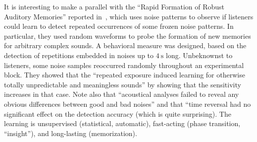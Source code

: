 \documentclass[brainsci, %
               review,accept,pdftex,moreauthors
               ]{Definitions/mdpi}
\begin{document}
It is interesting to make a parallel with the ``Rapid Formation of Robust Auditory Memories'' reported in~\citep{agus_rapid_2010}, which uses noise patterns to observe if listeners could learn to detect repeated occurrences of some frozen noise patterns. In particular, they used random waveforms to probe the formation of new memories for arbitrary complex sounds. A behavioral measure was designed, based on the detection of repetitions embedded in noises up to $4~ \si{\second}$ long. %
Unbeknownst to listeners, some noise samples reoccurred randomly throughout an experimental block. They showed that the ``repeated exposure induced learning for otherwise totally unpredictable and meaningless sounds'' by showing that the sensitivity increases in that case. Note also that ``acoustical analyses failed to reveal any obvious differences between good and bad noises'' and that ``time reversal had no significant effect on the detection accuracy (which is quite surprising). The learning is unsupervised (statistical, automatic), fast-acting (phase transition, ``insight''), and long-lasting (memorization). 
\end{document}
